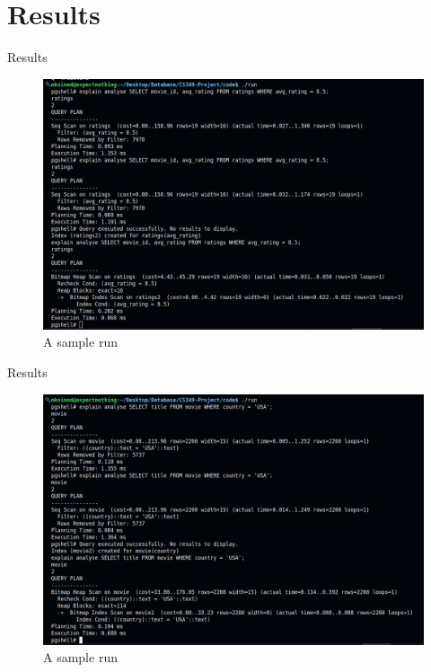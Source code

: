 \documentclass[Serif, 10pt, brown]{beamer}
\theoremstyle{example}
\theoremstyle{plain}
\begin{document}
\section{Results}
\begin{frame}{Results}
	\begin{figure}
        \centering
        \includegraphics[width=1\linewidth]{../images/Screenshot from 2025-05-01 11-27-38.png}
        \caption{A sample run}
    \end{figure}
\end{frame}

\begin{frame}{Results}
	\begin{figure}
        \centering
        \includegraphics[width=1\linewidth]{../images/Screenshot from 2025-05-01 11-35-24.png}
        \caption{A sample run}
    \end{figure}
\end{frame}
\end{document}
